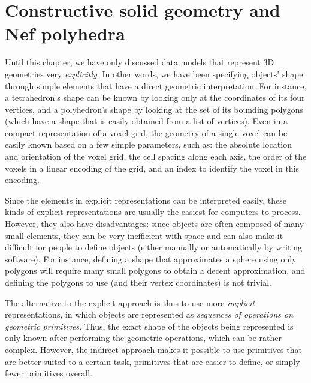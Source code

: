 
\setchapterpreamble[u]{\margintoc}

\graphicspath{{csg/}}

\chapter{Constructive solid geometry and Nef polyhedra}%
\label{chap:csg_nef}


Until this chapter, we have only discussed data models that represent 3D geometries very \emph{explicitly}.
In other words, we have been specifying objects' shape through simple elements that have a direct geometric interpretation.
For instance, a tetrahedron's shape can be known by looking only at the coordinates of its four vertices, and a polyhedron's shape by looking at the set of its bounding polygons (which have a shape that is easily obtained from a list of vertices).
Even in a compact representation of a voxel grid, the geometry of a single voxel can be easily known based on a few simple parameters, such as: the absolute location and orientation of the voxel grid, the cell spacing along each axis, the order of the voxels in a linear encoding of the grid, and an index to identify the voxel in this encoding.


Since the elements in explicit representations can be interpreted easily, these kinds of explicit representations are usually the easiest for computers to process.
However, they also have disadvantages: since objects are often composed of many small elements, they can be very inefficient with space and can also make it difficult for people to define objects (either manually or automatically by writing software).
For instance, defining a shape that approximates a sphere using only polygons will require many small polygons to obtain a decent approximation, and defining the polygons to use (and their vertex coordinates) is not trivial.


The alternative to the explicit approach is thus to use more \emph{implicit} representations, in which objects are represented as \emph{sequences of operations on geometric primitives}.
Thus, the exact shape of the objects being represented is only known after performing the geometric operations, which can be rather complex.
However, the indirect approach makes it possible to use primitives that are better suited to a certain task, primitives that are easier to define, or simply fewer primitives overall.

